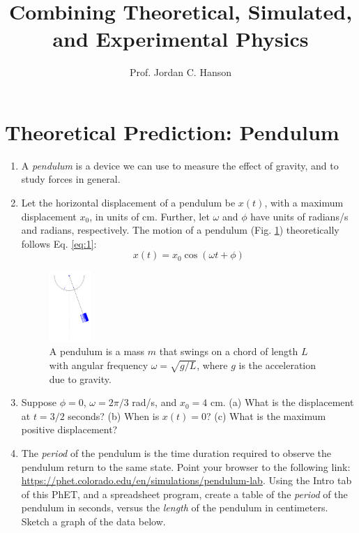 \documentclass{article}
\begin{document}
\twocolumn

\title{Combining Theoretical, Simulated, and Experimental Physics}
\author{Prof. Jordan C. Hanson}

\maketitle

\section{Theoretical Prediction: Pendulum}

\begin{enumerate}
\item A \textit{pendulum} is a device we can use to measure the effect of gravity, and to study forces in general.
\item Let the horizontal displacement of a pendulum be $x(t)$, with a maximum displacement $x_0$, in units of cm.  Further, let $\omega$ and $\phi$ have units of radians/s and radians, respectively. The motion of a pendulum (Fig. \ref{fig:pendulum}) theoretically follows Eq. \ref{eq:1}:
\begin{equation}
x(t) = x_0\cos(\omega t + \phi) \label{eq:1}
\end{equation} 
\begin{figure}[ht]
\centering
\includegraphics[width=0.15\textwidth]{pendulum.png}
\caption{\label{fig:pendulum} A pendulum is a mass $m$ that swings on a chord of length $L$ with angular frequency $\omega = \sqrt{g/L}$, where $g$ is the acceleration due to gravity.}
\end{figure}
\item Suppose $\phi = 0$, $\omega = 2\pi/3$ rad/s, and $x_0 = 4$ cm.  (a) What is the displacement at $t=3/2$ seconds? (b) When is $x(t) = 0$? (c) What is the maximum positive displacement? \\ \vspace{2cm}
\item The \textit{period} of the pendulum is the time duration required to observe the pendulum return to the same state.  Point your browser to the following link: \url{https://phet.colorado.edu/en/simulations/pendulum-lab}.  Using the Intro tab of this PhET, and a spreadsheet program, create a table of the \textit{period} of the pendulum in seconds, versus the \textit{length} of the pendulum in centimeters.  Sketch a graph of the data below. \\ \vspace{2cm}
\end{enumerate}
\end{document}
